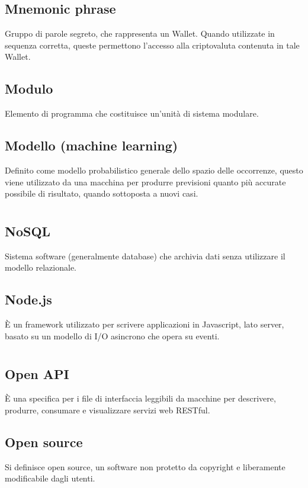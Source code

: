 	\subsection*{Mnemonic phrase}
	Gruppo di parole segreto, che rappresenta un Wallet. Quando utilizzate in sequenza corretta, queste permettono l’accesso alla criptovaluta contenuta in tale Wallet.
	\subsection*{Modulo}
	Elemento di programma che costituisce un’unità di sistema modulare.
	\subsection*{Modello (machine learning)}
	Definito come modello probabilistico generale dello spazio delle occorrenze, questo viene utilizzato da una macchina per produrre previsioni quanto più accurate possibile di risultato, quando sottoposta a nuovi casi.
\pagebreak
\section{}
	\subsection*{NoSQL}
	Sistema software (generalmente database) che archivia dati senza utilizzare il modello relazionale.
	\subsection*{Node.js}
	È un framework utilizzato per scrivere applicazioni in Javascript, lato server, basato su un modello di I/O asincrono che opera su eventi. 
\pagebreak
\section{}
	\subsection*{Open API}
	È una specifica per i file di interfaccia leggibili da macchine per descrivere, produrre, consumare e visualizzare servizi web RESTful.
	\subsection*{Open source}
	Si definisce open source, un software non protetto da copyright e liberamente modificabile dagli utenti.
